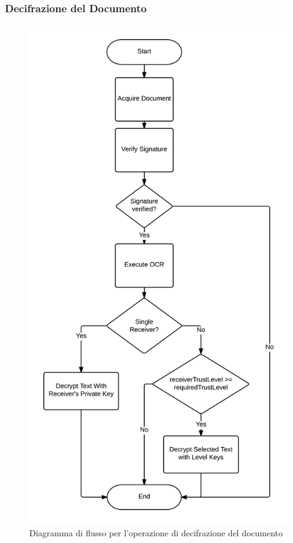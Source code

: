 \subsubsection{Decifrazione del Documento}
	\begin{center}	
		\begin{figure}[H]
		\centering
		\includegraphics[scale=0.6]{Immagini/decifrazione_vert}
		\caption[Flusso decifrazione documento]{Diagramma di flusso per l'operazione di decifrazione del documento}
		\label{fig:decifrazione}
		\end{figure}
	\end{center}
